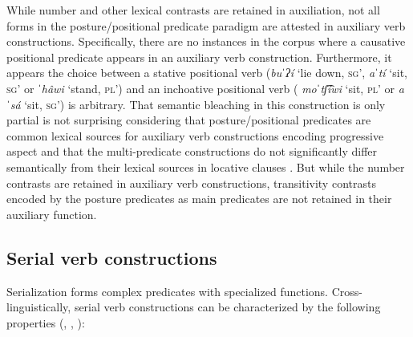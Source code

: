 While number and other lexical contrasts are retained in auxiliation, not all forms in the posture/positional predicate paradigm are attested in auxiliary verb constructions. Specifically, there are no instances in the corpus where a causative positional predicate appears in an auxiliary verb construction. Furthermore, it appears the choice between a stative positional verb (\textit{buˈʔí} `lie down, \textsc{sg}', \textit{aˈtí} `sit, \textsc{sg}' or \textit{ˈhâwi} `stand, \textsc{pl}') and an inchoative positional verb (\textit{ moˈtʃ͡íwi} `sit, \textsc{pl}' or \textit{aˈsá} `sit, \textsc{sg}') is arbitrary. That semantic bleaching in this construction is only partial is not surprising considering that posture/positional predicates are common lexical sources for auxiliary verb constructions encoding progressive aspect and that the multi-predicate constructions do not significantly differ semantically from their lexical sources in locative clauses \citep{bybee1989creation}. But while the number contrasts are retained in auxiliary verb constructions, transitivity contrasts encoded by the posture predicates as main predicates are not retained in their auxiliary function.


\subsection{Serial verb constructions}
\label{subsec: serial verb constructions}


Serialization forms complex predicates with specialized functions. Cross-linguis\-tically, serial verb constructions can be characterized by the following properties (\citealt{foley1985clausehood}, \citealt{sebba1987syntax}, \citealt{aikhenvald2006serial}):

